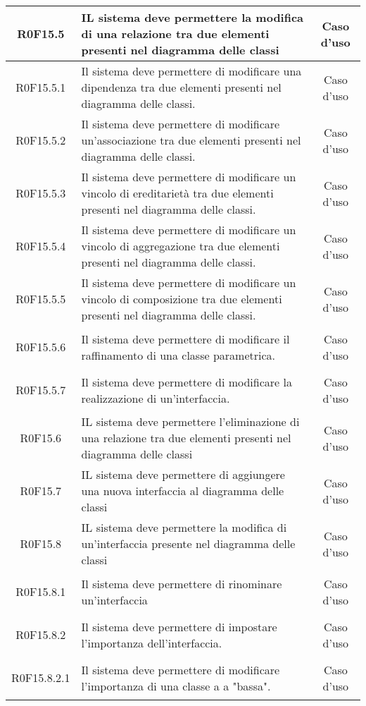 \documentclass[../AnalisiDeiRequisiti.tex]{subfiles}
\begin{document}
\begin{longtable}{|c|>{\centering}p{7cm}|c|}
\hypertarget{R0F15.5}{R0F15.5} & IL sistema deve permettere la modifica di una relazione tra due elementi presenti nel diagramma delle classi & Caso d'uso \\ \hline
\hypertarget{R0F15.5.1}{R0F15.5.1} & Il sistema deve permettere di modificare una dipendenza tra due elementi presenti nel diagramma delle classi. & Caso d'uso \\ \hline
\hypertarget{R0F15.5.2}{R0F15.5.2} & Il sistema deve permettere di modificare un'associazione tra due elementi presenti nel diagramma delle classi. & Caso d'uso \\ \hline
\hypertarget{R0F15.5.3}{R0F15.5.3} & Il sistema deve permettere di modificare un vincolo di ereditarietà tra due elementi presenti nel diagramma delle classi. & Caso d'uso \\ \hline
\hypertarget{R0F15.5.4}{R0F15.5.4} & Il sistema deve permettere di modificare un vincolo di aggregazione tra due elementi presenti nel diagramma delle classi. & Caso d'uso \\ \hline
\hypertarget{R0F15.5.5}{R0F15.5.5} & Il sistema deve permettere di modificare un vincolo di composizione tra due elementi presenti nel diagramma delle classi. & Caso d'uso \\ \hline
\hypertarget{R0F15.5.6}{R0F15.5.6} & Il sistema deve permettere di modificare il raffinamento di una classe parametrica.  & Caso d'uso \\ \hline
\hypertarget{R0F15.5.7}{R0F15.5.7} & Il sistema deve permettere di modificare la realizzazione di un'interfaccia. & Caso d'uso \\ \hline
\hypertarget{R0F15.6}{R0F15.6} & IL sistema deve permettere l'eliminazione di una relazione tra due elementi presenti nel diagramma delle classi & Caso d'uso \\ \hline
\hypertarget{R0F15.7}{R0F15.7} & IL sistema deve permettere di aggiungere una nuova interfaccia al diagramma delle classi & Caso d'uso \\ \hline
\hypertarget{R0F15.8}{R0F15.8} & IL sistema deve permettere la modifica di un'interfaccia presente nel diagramma delle classi & Caso d'uso \\ \hline
\hypertarget{R0F15.8.1}{R0F15.8.1} & Il sistema deve permettere di rinominare un'interfaccia & Caso d'uso \\ \hline
\hypertarget{R0F15.8.2}{R0F15.8.2} & Il sistema deve permettere di impostare l'importanza dell'interfaccia. & Caso d'uso \\ \hline
\hypertarget{R0F15.8.2.1}{R0F15.8.2.1} & Il sistema deve permettere di modificare l'importanza di una classe a a "bassa". & Caso d'uso \\ \hline

\end{longtable}
\end{document}

